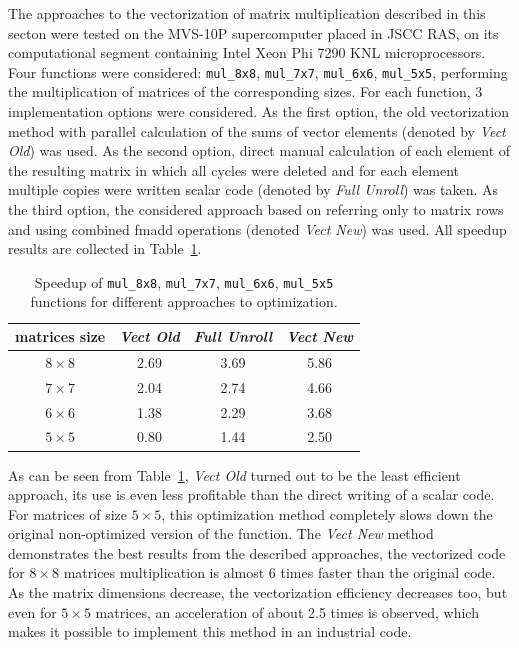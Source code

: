 \documentclass[
11pt,%
tightenlines,%
twoside,%
onecolumn,%
nofloats,%
nobibnotes,%
nofootinbib,%
superscriptaddress,%
noshowpacs,%
centertags]%
{revtex4}
\begin{document}
The approaches to the vectorization of matrix multiplication described in this secton were tested on the MVS-10P supercomputer placed in JSCC RAS, on its computational segment containing Intel Xeon Phi 7290 KNL microprocessors.
Four functions were considered: \texttt{mul\_8x8}, \texttt{mul\_7x7}, \texttt{mul\_6x6}, \texttt{mul\_5x5}, performing the multiplication of matrices of the corresponding sizes.
For each function, 3 implementation options were considered.
As the first option, the old vectorization method with parallel calculation of the sums of vector elements (denoted by \textit{Vect Old}) was used.
As the second option, direct manual calculation of each element of the resulting matrix in which all cycles were deleted and for each element multiple copies were written scalar code (denoted by \textit{Full Unroll}) was taken.
As the third option, the considered approach based on referring only to matrix rows and using combined fmadd operations (denoted \textit{Vect New}) was used.
All speedup results are collected in Table~\ref{tab:mul_speedup}.

\begin{table}[!h]
\setcaptionmargin{0mm}
\onelinecaptionsfalse
{}
\caption{Speedup of \texttt{mul\_8x8}, \texttt{mul\_7x7}, \texttt{mul\_6x6}, \texttt{mul\_5x5} functions for different approaches to optimization.}
\bigskip
\begin{tabular}{|c|c|c|c|}
\hline
matrices size & \textit{Vect Old} & \textit{Full Unroll} & \textit{Vect New} \\
\hline
$8 \times 8$ & 2.69 & 3.69 & 5.86 \\
$7 \times 7$ & 2.04 & 2.74 & 4.66 \\
$6 \times 6$ & 1.38 & 2.29 & 3.68 \\
$5 \times 5$ & 0.80 & 1.44 & 2.50 \\
\hline
\end{tabular}
\label{tab:mul_speedup}
\end{table}

As can be seen from Table~\ref{tab:mul_speedup}, \textit{Vect Old} turned out to be the least efficient approach, its use is even less profitable than the direct writing of a scalar code.
For matrices of size $5 \times 5$, this optimization method completely slows down the original non-optimized version of the function.
The \textit{Vect New} method demonstrates the best results from the described approaches, the vectorized code for $8 \times 8$ matrices multiplication is almost 6 times faster than the original code.
As the matrix dimensions decrease, the vectorization efficiency decreases too, but even for $5 \times 5$ matrices, an acceleration of about 2.5 times is observed, which makes it possible to implement this method in an industrial code.
\end{document}
